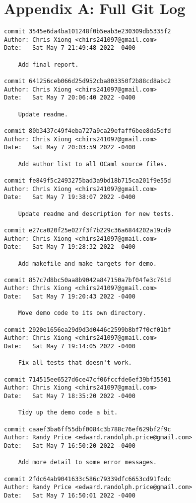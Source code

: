\section{Appendix A: Full Git Log}

{\scriptsize
\begin{verbatim}
commit 3545e6da4ba101248f0b5eab3e230309db5335f2
Author: Chris Xiong <chirs241097@gmail.com>
Date:   Sat May 7 21:49:48 2022 -0400

    Add final report.

commit 641256ceb066d25d952cba803350f2b88cd8abc2
Author: Chris Xiong <chirs241097@gmail.com>
Date:   Sat May 7 20:06:40 2022 -0400

    Update readme.

commit 80b3437c49f4eba727a9ca29efaff6bee8da5dfd
Author: Chris Xiong <chirs241097@gmail.com>
Date:   Sat May 7 20:03:59 2022 -0400

    Add author list to all OCaml source files.

commit fe849f5c2493275bad3a9bd18b715ca201f9e55d
Author: Chris Xiong <chirs241097@gmail.com>
Date:   Sat May 7 19:38:07 2022 -0400

    Update readme and description for new tests.

commit e27ca020f25e027f3f7b229c36a6844202a19cd9
Author: Chris Xiong <chirs241097@gmail.com>
Date:   Sat May 7 19:28:32 2022 -0400

    Add makefile and make targets for demo.

commit 857c7d8bc50aa8b9042a847150a7bf04fe3c761d
Author: Chris Xiong <chirs241097@gmail.com>
Date:   Sat May 7 19:20:43 2022 -0400

    Move demo code to its own directory.

commit 2920e1656ea29d9d3d0446c2599b8bf7f0cf01bf
Author: Chris Xiong <chirs241097@gmail.com>
Date:   Sat May 7 19:14:05 2022 -0400

    Fix all tests that doesn't work.

commit 714515ee6527d6ce47cf06fccfde6ef39bf35501
Author: Chris Xiong <chirs241097@gmail.com>
Date:   Sat May 7 18:35:20 2022 -0400

    Tidy up the demo code a bit.

commit caaef3ba6ff55dbf0084c3b788c76ef629bf2f9c
Author: Randy Price <edward.randolph.price@gmail.com>
Date:   Sat May 7 16:50:20 2022 -0400

    Add more detail to some error messages.

commit 2fdc64ab9041633c586c79339dfc6653cd91fddc
Author: Randy Price <edward.randolph.price@gmail.com>
Date:   Sat May 7 16:50:01 2022 -0400


\end{verbatim}}
